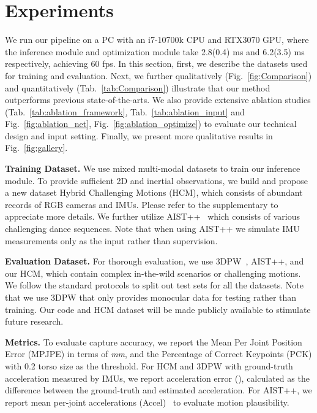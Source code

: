 \documentclass[letterpaper]{article} \usepackage{aaai23}  \usepackage{times}  \usepackage{helvet}  \usepackage{courier}  \usepackage[hyphens]{url}  \usepackage{graphicx} \urlstyle{rm} \def\UrlFont{\rm}  \usepackage{natbib}  \usepackage{caption} \frenchspacing  \setlength{\pdfpagewidth}{8.5in}  \setlength{\pdfpageheight}{11in}  \usepackage{algorithm}
\newcommand{\myparagraph}[1]{\vspace{0.1em}\noindent\textbf{#1}}
\begin{document}
\section{Experiments}
\label{ExperimentalResults}
We run our pipeline on a PC with an i7-10700k CPU and RTX3070 GPU, where the inference module and optimization module take 2.8(0.4) ms and 6.2(3.5) ms respectively, achieving 60 fps. 
In this section, first, we describe the datasets used for training and evaluation. 
Next, we further qualitatively (Fig.~\ref{fig:Comparison}) and quantitatively (Tab.~\ref{tab:Comparison}) illustrate that our method outperforms previous state-of-the-arts.
We also provide extensive ablation studies (Tab.~\ref{tab:ablation_framework}, Tab.~\ref{tab:ablation_input} and Fig.~\ref{fig:ablation_net}, Fig.~\ref{fig:ablation_optimize}) to evaluate our technical design and input setting.
Finally, we present more qualitative results in Fig.~\ref{fig:gallery}.



\myparagraph{Training Dataset.}
We use mixed multi-modal datasets to train our inference module.
To provide sufficient 2D and inertial observations, we build and propose a new dataset Hybrid Challenging Motions (HCM), which consists of abundant records of RGB cameras and IMUs. Please refer to the supplementary to appreciate more details.
We further utilize AIST++~\cite{li2021learn,aist-dance-db} which consists of various challenging dance sequences. 
Note that when using AIST++ we simulate  IMU measurements only as the input rather than supervision. 

\myparagraph{Evaluation Dataset.}
For thorough evaluation, we use 3DPW~\cite{vonMarcard2018}, AIST++, and our HCM, which contain complex in-the-wild scenarios or challenging motions. We follow the standard protocols to split out test sets for all the datasets.
Note that we use 3DPW that only provides monocular data for testing rather than training. 
Our code and HCM dataset will be made publicly available to stimulate future research.

\myparagraph{Metrics.}
To evaluate capture accuracy, we report the Mean Per Joint Position Error (MPJPE) in terms of \textit{mm}, and the Percentage of Correct Keypoints (PCK) with 0.2 torso size as the threshold. For HCM and 3DPW with ground-truth acceleration measured by IMUs, we report acceleration error (), calculated as the difference between the 
ground-truth and estimated acceleration. For AIST++, we report mean per-joint accelerations (Accel)~\cite{Kanazawa_2019CVPR,HUMOR_ICCV2021} to evaluate motion plausibility.
\end{document}
